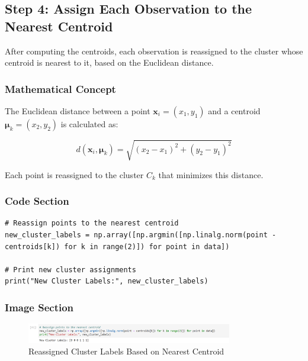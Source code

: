 \documentclass{exam}
\begin{document}
\newpage

\subsection{Step 4: Assign Each Observation to the Nearest Centroid}

After computing the centroids, each observation is reassigned to the cluster whose centroid is nearest to it, based on the Euclidean distance.

\subsubsection*{Mathematical Concept}
The Euclidean distance between a point \( \mathbf{x}_i = (x_1, y_1) \) and a centroid \( \mathbf{\mu}_k = (x_2, y_2) \) is calculated as:

\[
d(\mathbf{x}_i, \mathbf{\mu}_k) = \sqrt{(x_2 - x_1)^2 + (y_2 - y_1)^2}
\]

Each point is reassigned to the cluster \( C_k \) that minimizes this distance.

\subsubsection*{Code Section}

\begin{verbatim}
# Reassign points to the nearest centroid
new_cluster_labels = np.array([np.argmin([np.linalg.norm(point - centroids[k]) for k in range(2)]) for point in data])

# Print new cluster assignments
print("New Cluster Labels:", new_cluster_labels)
\end{verbatim}

\subsubsection*{Image Section}

\begin{figure}[h!]
    \centering
    \includegraphics[width=0.8\textwidth]{images/reassigned_points.png}
    \caption{Reassigned Cluster Labels Based on Nearest Centroid}
    \label{fig:reassigned_clusters}
\end{figure}

\newpage
\end{document}
